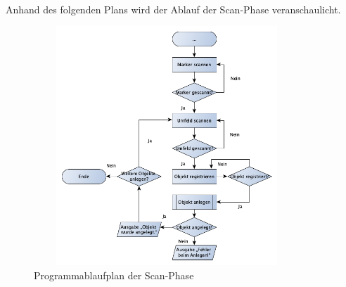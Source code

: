 \\ 
Anhand des folgenden Plans wird der Ablauf der Scan-Phase veranschaulicht.
\begin{figure}[hbt!]
    \centering
    \includegraphics[width=10cm,height=9cm,keepaspectratio]{4Umsetzung/Bilder/scanPAP.png}
    \caption{Programmablaufplan der Scan-Phase}
    \label{pic:startmenu}
\end{figure}